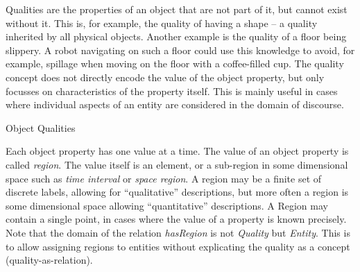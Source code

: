 Qualities are the properties of an object that are not part of it, but cannot exist without it.
This is, for example, the quality of having a shape -- a quality inherited by all physical objects.
Another example is the quality of a floor being slippery.
A robot navigating on such a floor could use this knowledge to avoid, for example,
spillage when moving on the floor with a coffee-filled cup.
The quality concept does not directly encode the value of the object property, but only focusses on characteristics of the property itself.
This is mainly useful in cases where individual aspects of an entity are considered in the domain of discourse.

\begin{ODP}{Object Qualities}
\end{ODP}

Each object property has one value at a time. The value of an object property is called \emph{region}.
The value itself is an element, or a sub-region in some dimensional
space such as \emph{time interval} or \emph{space region}.
A region may be a finite set of discrete labels, allowing for ``qualitative'' descriptions,
but more often a region is some dimensional space allowing ``quantitative'' descriptions.
A Region may contain a single point, in cases where the value of a property is known precisely.
Note that the domain of the relation \emph{hasRegion} is not \emph{Quality} but \emph{Entity}.
This is to allow assigning regions to entities without explicating the quality as a concept (quality-as-relation).

